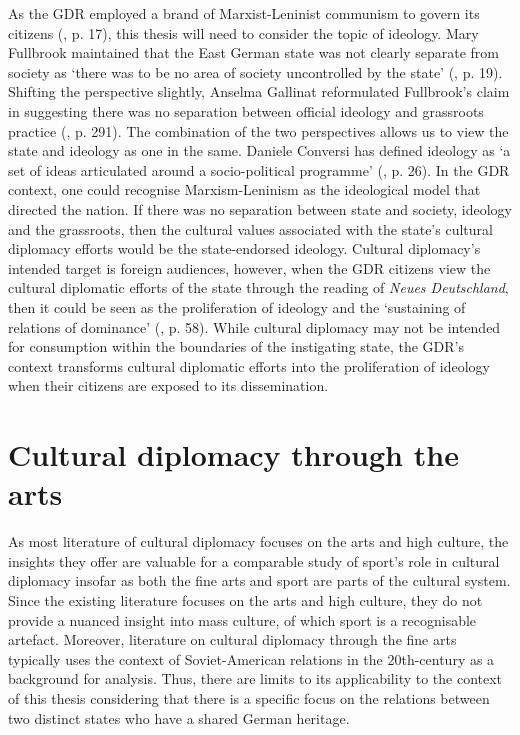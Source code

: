 As the GDR employed a brand of Marxist-Leninist communism to govern its citizens (\cite{grixcooke2002}, p. 17), this thesis will need to consider the topic of ideology. Mary Fullbrook maintained that the East German state was not clearly separate from society as ‘there was to be no area of society uncontrolled by the state’ (\citeyear{fullbrook1995}, p. 19). Shifting the perspective slightly, Anselma Gallinat reformulated Fullbrook’s claim in suggesting there was no separation between official ideology and grassroots practice (\citeyear{gallinat2005}, p. 291). The combination of the two perspectives allows us to view the state and ideology as one in the same. Daniele Conversi has defined ideology as ‘a set of ideas articulated around a socio-political programme’ (\citeyear{conversi2010}, p. 26). In the GDR context, one could recognise Marxism-Leninism as the ideological model that directed the nation. If there was no separation between state and society, ideology and the grassroots, then the cultural values associated with the state’s cultural diplomacy efforts would be the state-endorsed ideology. Cultural diplomacy’s intended target is foreign audiences, however, when the GDR citizens view the cultural diplomatic efforts of the state through the reading of \textit{Neues Deutschland}, then it could be seen as the proliferation of ideology and the ‘sustaining of relations of dominance’ (\cite{thompson1990}, p. 58). While cultural diplomacy may not be intended for consumption within the boundaries of the instigating state, the GDR’s context transforms cultural diplomatic efforts into the proliferation of ideology when their citizens are exposed to its dissemination.

\section{Cultural diplomacy through the arts}

As most literature of cultural diplomacy focuses on the arts and high culture, the insights they offer are valuable for a comparable study of sport’s role in cultural diplomacy insofar as both the fine arts and sport are parts of the cultural system. Since the existing literature focuses on the arts and high culture, they do not provide a nuanced insight into mass culture, of which sport is a recognisable artefact. Moreover, literature on cultural diplomacy through the fine arts typically uses the context of Soviet-American relations in the 20th-century as a background for analysis. Thus, there are limits to its applicability to the context of this thesis considering that there is a specific focus on the relations between two distinct states who have a shared German heritage.

